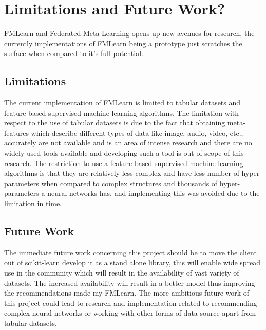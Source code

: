 \chapter{Limitations and Future Work?}

FMLearn and Federated Meta-Learning opens up new avenues for research, the currently implementations of FMLearn being a prototype just scratches the surface when compared to it's full potential.

\section*{Limitations}

The current implementation of FMLearn is limited to tabular datasets and feature‐based supervised machine learning algorithms. The limitation with respect to the use of tabular datasets is due to the fact that obtaining meta-features which describe different types of data like image, audio, video, etc., accurately are not available and is an area of intense research \citep{image-meta-data} \citep{image-meta-data-2} and there are no widely used tools available and developing such a tool is out of scope of this research. The restriction to use a feature-based supervised machine learning algorithms is that they are relatively less complex and have less number of hyper-parameters when compared to complex structures and thousands of hyper-parameters a neural networks has, and implementing this was avoided due to the limitation in time.

\section*{Future Work}

The immediate future work concerning this project should be to move the client out of scikit-learn develop it as a stand alone library, this will enable wide spread use in the community which will result in the availability of vast variety of datasets. The increased availability will result in a better model thus improving the recommendations made my FMLearn. The more ambitious future work of this project could lead to research and implementation related to recommending complex neural networks or working with other forms of data source apart from tabular datasets.